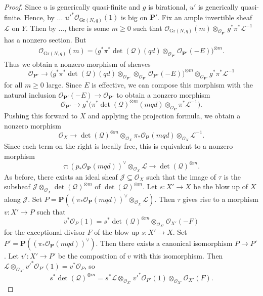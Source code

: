 \begin{proof}
Since $u$ is generically quasi-finite and $g$ is birational,
$u'$ is generically quasi-finite.
Hence, by ...
$u'^*\mathcal{O}_{\mathrm{Gr}(N,q)}(1)$ is big
on $\mathbf{P}'$.
Fix an ample invertible sheaf $\mathcal{L}$ on $Y$.
Then by ..., there is some $m \geq 0$
such that
$\mathcal{O}_{\mathrm{Gr}(N,q)}(m)
  \otimes_{\mathcal{O}_{\mathbf{P}'}} g^*\pi^*\mathcal{L}^{-1}$
has a nonzero section.
But
\begin{align*}
  \mathcal{O}_{\mathrm{Gr}(N,q)}(m)
  = \big(g^*\pi^*\det(\mathcal{Q})(qd) \otimes_{\mathcal{O}_{\mathbf{P}'}}
    \mathcal{O}_{\mathbf{P}'}(-E)\big)^{\otimes m}.
\end{align*}
Thus we obtain a nonzero morphism of sheaves
$$
\mathcal{O}_{\mathbf{P}'} \to
    \big(g^*\pi^*\det(\mathcal{Q})(qd) \otimes_{\mathcal{O}_{\mathbf{P}'}}
      \otimes_{\mathcal{O}_{\mathbf{P}'}}
    \mathcal{O}_{\mathbf{P}'}(-E)\big)^{\otimes m}
      \otimes_{\mathcal{O}_{\mathbf{P}'}}
    g^*\pi^*\mathcal{L}^{-1}
$$
for all $m \geq 0$ large.
Since $E$ is effective, we can compose this morphism with the natural
inclusion $\mathcal{O}_{\mathbf{P}'}(-E) \to \mathcal{O}_{\mathbf{P}'}$
to obtain a nonzero morphism
$$
\mathcal{O}_{\mathbf{P}'} \to
    g^*\big(\pi^*\det(\mathcal{Q})^{\otimes m}(mqd)
      \otimes_{\mathcal{O}_{\mathbf{P}}}
    \pi^*\mathcal{L}^{-1}\big).
$$
Pushing this forward to $X$ and applying the projection formula, we obtain
a nonzero morphism
$$
\mathcal{O}_X \to
  \det(\mathcal{Q})^{\otimes m}
    \otimes_{\mathcal{O}_X}
  \pi_*\mathcal{O}_{\mathbf{P}}(mqd)
    \otimes_{\mathcal{O}_X}
  \mathcal{L}^{-1}.
$$
Since each term on the right is locally free, this is equivalent to a nonzero
morphism
$$
\tau :
  (p_*\mathcal{O}_{\mathbf{P}}(mqd))^\vee \otimes_{\mathcal{O}_X} \mathcal{L}
    \to \det(\mathcal{Q})^{\otimes m}.
$$
As before, there exists an ideal sheaf $\mathcal{J} \subseteq \mathcal{O}_X$
such that the image of $\tau$ is the subsheaf
$\mathcal{J} \otimes_{\mathcal{O}_X} \det(\mathcal{Q})^{\otimes m}$ of
$\det(\mathcal{Q})^{\otimes m}$.
Let $s : X' \to X$ be the blow up of $X$ along $\mathcal{J}$.
Set
$P = \mathbf{P}((\pi_*\mathcal{O}_{\mathbf{P}}(mqd))^\vee
        \otimes_{\mathcal{O}_X} \mathcal{L})$.
Then $\tau$ gives rise to a morphism
$v : X' \to P$
such that
$$
v^*\mathcal{O}_P(1) = s^*\det(\mathcal{Q})^{\otimes m}
                        \otimes_{\mathcal{O}_{X'}} \mathcal{O}_{X'}(-F)
$$
for the exceptional divisor $F$ of the blow up $s : X' \to X$.
Set $P' = \mathbf{P}((\pi_*\mathcal{O}_{\mathbf{P}}(mqd))^\vee)$.
Then there exists a canonical isomorphism
$P \to P'$.
Let $v' : X' \to P'$ be the composition of $v$ with this isomorphism.
Then
$
\mathcal{L} \otimes_{\mathcal{O}_{X'}} v'^* \mathcal{O}_{P'}(1)
  = v^* \mathcal{O}_P
$, so
$$
  s^*\det(\mathcal{Q})^{\otimes m}
    = s^*\mathcal{L}
        \otimes_{\mathcal{O}_{X'}} v'^* \mathcal{O}_{P'}(1)
        \otimes_{\mathcal{O}_{X'}} \mathcal{O}_{X'}(F).
$$


\end{proof}
